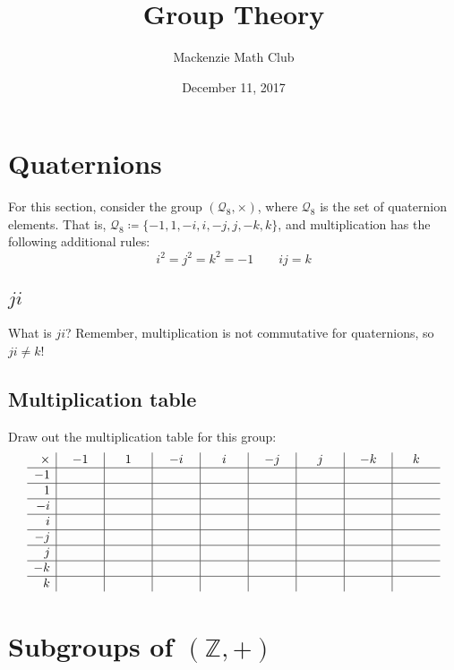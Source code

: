 

\title{Group Theory}
\author{Mackenzie Math Club}
\date{December 11, 2017}



	\section{Quaternions}
		For this section, consider the group $(\mathcal{Q}_8, \times)$, where $\mathcal{Q}_8$ is the set of quaternion elements. That is, $\mathcal{Q}_8 \coloneqq \{-1, 1, -i, i, -j, j, -k, k\}$, and multiplication has the following additional rules:
		\[i^2 = j^2 = k^2 = -1 \qquad ij = k\]
		\vspace{-10ex}
		\subsection{$ji$}
			What is $ji$? Remember, multiplication is not commutative for quaternions, so $ji \neq k$!
			\solutionspace{1ex}
		\subsection{Multiplication table}
			Draw out the multiplication table for this group:
			\begin{equation*}
				\begin{array}{r|c|c|c|c|c|c|c|c}
					\times & \mathmakebox[1cm]{-1} & \mathmakebox[1cm]{1} & \mathmakebox[1cm]{-i} & \mathmakebox[1cm]{i} & \mathmakebox[1cm]{-j} & \mathmakebox[1cm]{j} & \mathmakebox[1cm]{-k} & \mathmakebox[1cm]{k}\\\hline
					-1     &    &   &    &   &    &   &    &  \\\hline
					1      &    &   &    &   &    &   &    &  \\\hline
					-i     &    &   &    &   &    &   &    &  \\\hline
					i      &    &   &    &   &    &   &    &  \\\hline
					-j     &    &   &    &   &    &   &    &  \\\hline
					j      &    &   &    &   &    &   &    &  \\\hline
					-k     &    &   &    &   &    &   &    &  \\\hline
					k      &    &   &    &   &    &   &    &
				\end{array}
			\end{equation*}
	\section{Subgroups of $(\mathbb{Z}, +)$}
